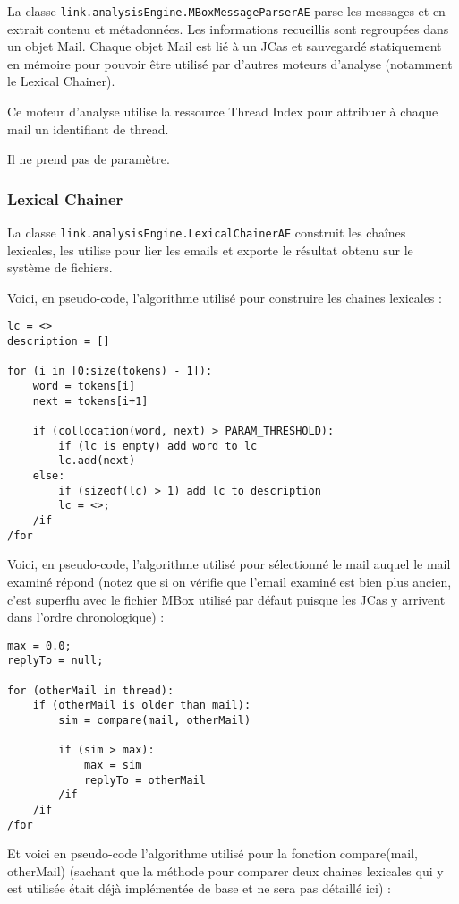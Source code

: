 \documentclass[a4paper]{article}
\begin{document}
La classe \texttt{link.analysisEngine.MBoxMessageParserAE} parse les messages et en extrait contenu et métadonnées. Les informations recueillis sont regroupées dans un objet Mail. Chaque objet Mail est lié à un JCas et sauvegardé statiquement en mémoire pour pouvoir être utilisé par d'autres moteurs d'analyse (notamment le Lexical Chainer).

Ce moteur d'analyse utilise la ressource Thread Index pour attribuer à chaque mail un identifiant de thread.

Il ne prend pas de paramètre.

\subsubsection{Lexical Chainer}

La classe \texttt{link.analysisEngine.LexicalChainerAE} construit les chaînes lexicales, les utilise pour lier les emails et exporte le résultat obtenu sur le système de fichiers.

Voici, en pseudo-code, l'algorithme utilisé pour construire les chaines lexicales :
	
\begin{lstlisting}
lc = <>
description = []

for (i in [0:size(tokens) - 1]):
	word = tokens[i]
	next = tokens[i+1]
	
	if (collocation(word, next) > PARAM_THRESHOLD):
		if (lc is empty) add word to lc
		lc.add(next)
	else:
		if (sizeof(lc) > 1) add lc to description
		lc = <>;
	/if
/for
\end{lstlisting}

Voici, en pseudo-code, l'algorithme utilisé pour sélectionné le mail auquel le mail examiné répond (notez que si on vérifie que l'email examiné est bien plus ancien, c'est superflu avec le fichier MBox utilisé par défaut puisque les JCas y arrivent dans l'ordre chronologique) :

\begin{lstlisting}
max = 0.0;
replyTo = null;

for (otherMail in thread):
	if (otherMail is older than mail):
		sim = compare(mail, otherMail)
		
		if (sim > max):
			max = sim
			replyTo = otherMail
		/if
	/if
/for
\end{lstlisting}

Et voici en pseudo-code l'algorithme utilisé pour la fonction compare(mail, otherMail) (sachant que la méthode pour comparer deux chaines lexicales qui y est utilisée était déjà implémentée de base et ne sera pas détaillé ici) :
\end{document}
